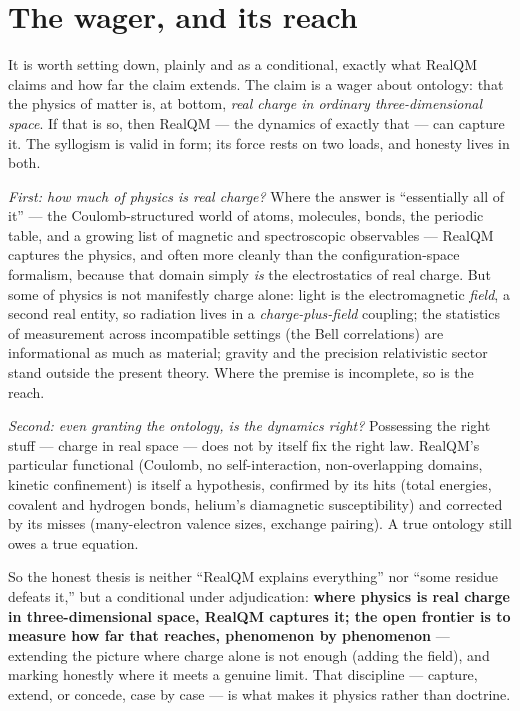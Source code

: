 \documentclass[11pt]{article}
\begin{document}
\section{The wager, and its reach}

It is worth setting down, plainly and as a conditional, exactly what RealQM claims and how far the claim
extends. The claim is a wager about ontology: that the physics of matter is, at bottom, \emph{real charge in
ordinary three-dimensional space}. If that is so, then RealQM --- the dynamics of exactly that --- can capture
it. The syllogism is valid in form; its force rests on two loads, and honesty lives in both.

\emph{First: how much of physics is real charge?} Where the answer is ``essentially all of it'' --- the
Coulomb-structured world of atoms, molecules, bonds, the periodic table, and a growing list of magnetic and
spectroscopic observables --- RealQM captures the physics, and often more cleanly than the configuration-space
formalism, because that domain simply \emph{is} the electrostatics of real charge. But some of physics is not
manifestly charge alone: light is the electromagnetic \emph{field}, a second real entity, so radiation lives in
a \emph{charge-plus-field} coupling; the statistics of measurement across incompatible settings (the Bell
correlations) are informational as much as material; gravity and the precision relativistic sector stand outside
the present theory. Where the premise is incomplete, so is the reach.

\emph{Second: even granting the ontology, is the dynamics right?} Possessing the right stuff --- charge in real
space --- does not by itself fix the right law. RealQM's particular functional (Coulomb, no self-interaction,
non-overlapping domains, kinetic confinement) is itself a hypothesis, confirmed by its hits (total energies,
covalent and hydrogen bonds, helium's diamagnetic susceptibility) and corrected by its misses (many-electron
valence sizes, exchange pairing). A true ontology still owes a true equation.

So the honest thesis is neither ``RealQM explains everything'' nor ``some residue defeats it,'' but a conditional
under adjudication: \textbf{where physics is real charge in three-dimensional space, RealQM captures it; the open
frontier is to measure how far that reaches, phenomenon by phenomenon} --- extending the picture where charge
alone is not enough (adding the field), and marking honestly where it meets a genuine limit. That discipline ---
capture, extend, or concede, case by case --- is what makes it physics rather than doctrine.
\end{document}
